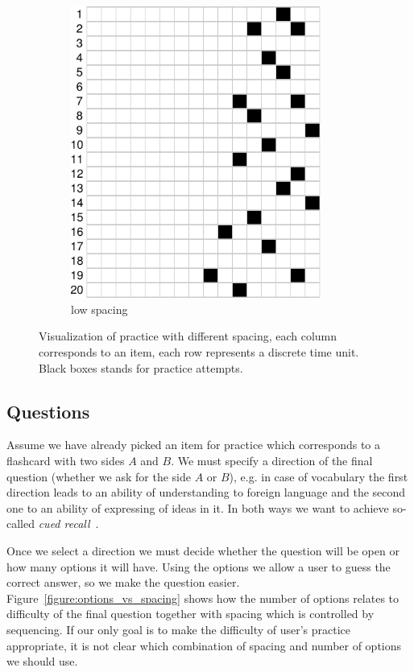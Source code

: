 \documentclass[table,color,cover,twoside,nolot,nolof]{fithesis3/fithesis3}
\begin{document}
\begin{figure}
\begin{subfigure}[b]{.5\textwidth}
		\includegraphics[width=0.9\textwidth]{figure/practice_progress_b}
		\caption{low spacing}
		\label{figure:practice_progress_b}
	\end{subfigure}
	\caption{Visualization of practice with different spacing, each column
		corresponds to an item, each row represents a discrete time unit. Black
		boxes stands for practice attempts.}
	\label{figure:practice_progress}
\end{figure}

\subsection{Questions}

Assume we have already picked an item for practice which corresponds to a
flashcard with two sides $A$ and $B$. We must specify a direction of the final
question (whether we ask for the side $A$ or $B$), e.g. in case of vocabulary
the first direction leads to an ability of understanding to foreign language
and the second one to an ability of expressing of ideas in it. In both ways we
want to achieve so-called \emph{cued recall}~\cite{carpenter2006types}.

Once we select a direction we must decide whether the question will be
open or how many options it will have. Using the options we allow a user
to guess the correct answer, so we make the question easier.
Figure~\ref{figure:options_vs_spacing} shows how the number of options relates
to difficulty of the final question together with spacing which is controlled
by sequencing. If our only goal is to make the difficulty of user's practice
appropriate, it is not clear which combination of spacing and number of options
we should use.
\end{document}
